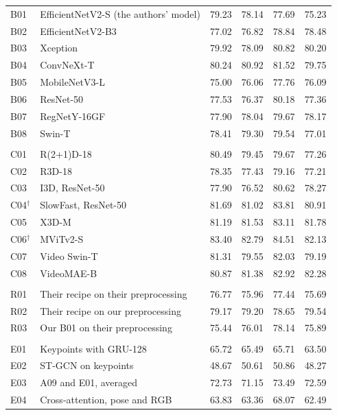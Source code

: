 {\begin{longtable}{@{}llcccc@{}}
B01 & EfficientNetV2-S (the authors' model) & 79.23 & 78.14 & 77.69 & 75.23 \\
B02 & EfficientNetV2-B3 & 77.02 & 76.82 & 78.84 & 78.48 \\
B03 & Xception & 79.92 & 78.09 & 80.82 & 80.20 \\
B04 & ConvNeXt-T & 80.24 & 80.92 & 81.52 & 79.75 \\
B05 & MobileNetV3-L & 75.00 & 76.06 & 77.76 & 76.09 \\
B06 & ResNet-50 & 77.53 & 76.37 & 80.18 & 77.36 \\
B07 & RegNetY-16GF & 77.90 & 78.04 & 79.67 & 78.17 \\
B08 & Swin-T & 78.41 & 79.30 & 79.54 & 77.01 \\
\addlinespace
\multicolumn{6}{@{}l}{\textit{Video backbones, fine-tuned}} \\
C01 & R(2+1)D-18 & 80.49 & 79.45 & 79.67 & 77.26 \\
C02 & R3D-18 & 78.35 & 77.43 & 79.16 & 77.21 \\
C03 & I3D, ResNet-50 & 77.90 & 76.52 & 80.62 & 78.27 \\
C04$^{\dagger}$ & SlowFast, ResNet-50 & 81.69 & 81.02 & 83.81 & 80.91 \\
C05 & X3D-M & 81.19 & 81.53 & 83.11 & 81.78 \\
C06$^{\dagger}$ & MViTv2-S & 83.40 & 82.79 & 84.51 & 82.13 \\
C07 & Video Swin-T & 81.31 & 79.55 & 82.03 & 79.19 \\
C08 & VideoMAE-B & 80.87 & 81.38 & 82.92 & 82.28 \\
\addlinespace
\multicolumn{6}{@{}l}{\textit{Reproduction of the authors' method}} \\
R01 & Their recipe on their preprocessing & 76.77 & 75.96 & 77.44 & 75.69 \\
R02 & Their recipe on our preprocessing & 79.17 & 79.20 & 78.65 & 79.54 \\
R03 & Our B01 on their preprocessing & 75.44 & 76.01 & 78.14 & 75.89 \\
\addlinespace
\multicolumn{6}{@{}l}{\textit{Pose}} \\
E01 & Keypoints with GRU-128 & 65.72 & 65.49 & 65.71 & 63.50 \\
E02 & ST-GCN on keypoints & 48.67 & 50.61 & 50.86 & 48.27 \\
E03 & A09 and E01, averaged & 72.73 & 71.15 & 73.49 & 72.59 \\
E04 & Cross-attention, pose and RGB & 63.83 & 63.36 & 68.07 & 62.49 \\

\end{longtable}}
